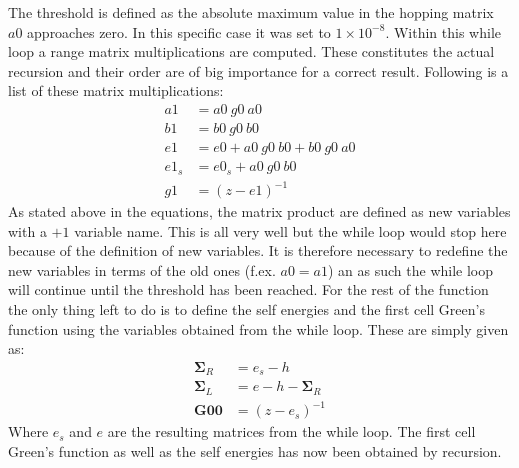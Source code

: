 The threshold is defined as the absolute maximum value in the hopping matrix \(a0\) approaches zero. In this specific case it was set to \(1\times10^{-8} \). Within this while loop a range matrix multiplications are computed. These constitutes the actual recursion and their order are of big importance for a correct result. Following is a list of these matrix multiplications: 
\begin{align*}
a1 &= a0\ g0\ a0\\
b1 &= b0\ g0\ b0\\
e1 &= e0 + a0\ g0\ b0 + b0\ g0\ a0 \\
e1_{s} &= e0_{s} + a0\ g0\ b0 \\
g1 &= (z - e1)^{-1}
\end{align*}
As stated above in the equations, the matrix product are defined as new variables with a \(+1\) variable name. This is all very well but the while loop would stop here because of the definition of new variables. It is therefore necessary to redefine the new variables in terms of the old ones (f.ex. \(a0 = a1\)) an as such the while loop will continue until the threshold has been reached. For the rest of the function the only thing left to do is to define the self energies and the first cell Green's function using the variables obtained from the while loop. These are simply given as: 
\begin{align*}\label{\outputs}
    \mathbf{\Sigma}_R &= e_s - h \\
    \mathbf{\Sigma}_L &= e - h - \mathbf{\Sigma}_R \\
    \mathbf{G00} &= (z - e_s)^{-1}
\end{align*}
Where \(e_s\) and \(e\) are the resulting matrices from the while loop. The first cell Green's function as well as the self energies has now been obtained by recursion. 
